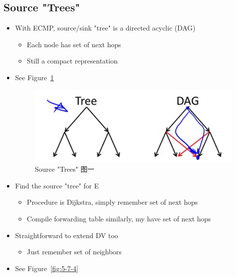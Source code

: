 \documentclass[12pt]{ctexart}   %
\begin{document}
	\subsection{Source "Trees"}
	\begin{itemize}
		\item With ECMP, source/sink "tree" is a directed acyclic (DAG)
		\begin{itemize}
			\item Each node has set of next hops
			\item Still a compact representation
		\end{itemize}
		\item See Figure~\ref{fig:5-7-3}
			
		\begin{figure}[h!] %
		\centering
		 \includegraphics[scale=0.7]{images/5-7-3}
		\caption{ Source "Trees" 图一 }
		 \label{fig:5-7-3}
		 \end{figure}
		 
		 \item Find the source "tree" for E
		 \begin{itemize}
		 	\item Procedure is Dijkstra, simply remember set of next hops
		 	\item Compile forwarding table similarly, my have set of next hops
		 \end{itemize}
		 
		 \item Straightforward to extend DV too
		 \begin{itemize}
		 	\item Just remember set of neighbors
		 \end{itemize}
		 \item See Figure~\ref{fig:5-7-4}
			

\end{itemize}
\end{document}
